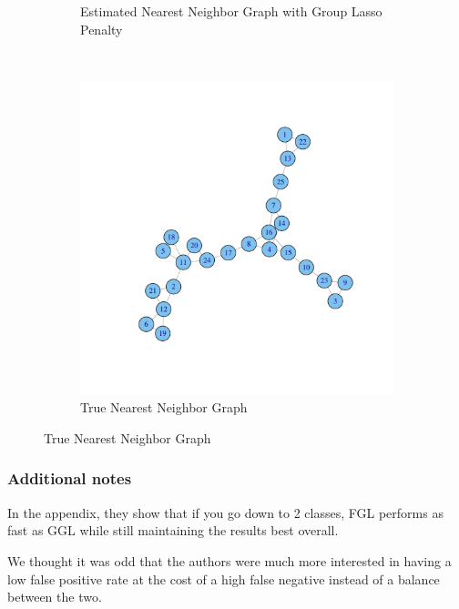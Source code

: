 \documentclass[t]{beamer}
\begin{document}
\begin{frame}
\begin{figure}
\begin{subfigure}[b]{0.40\textwidth}
  \caption{Estimated Nearest Neighbor Graph with Group Lasso Penalty}
\label{fig:nearestgaphsestimate}
\end{subfigure}\\
\begin{subfigure}[b]{0.50\textwidth}
  \includegraphics [scale=0.15]{Omega3-f.pdf}
  \caption{True Nearest Neighbor Graph}
\label{fig:nearestgaphsactual}
\end{subfigure}
\end{figure}
\end{frame}

\begin{frame}
\frametitle{Additional notes}
In the appendix, they show that if you go down to 2 classes, FGL performs as fast as GGL while still maintaining the results best overall.

\bigskip
\pause
We thought it was odd that the authors were much more interested in having  a low false positive rate at the cost of a high false negative instead of a balance between the two. 

\end{frame}

%

%        
%        
%
\end{document}
